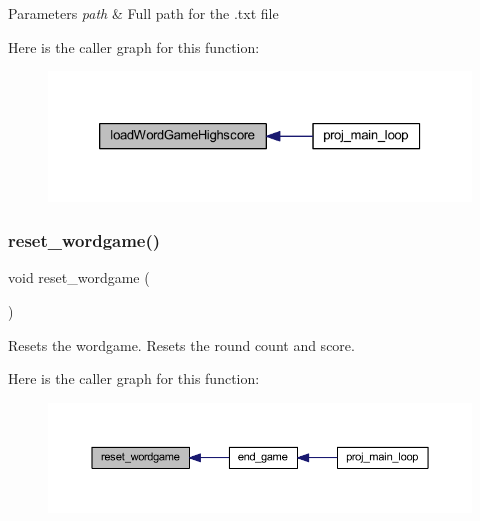 \begin{DoxyParams}{Parameters}
{\em path} & Full path for the .txt file \\
\hline
\end{DoxyParams}
Here is the caller graph for this function\+:\nopagebreak
\begin{figure}[H]
\begin{center}
\leavevmode
\includegraphics[width=326pt]{group__wordpicker_gab63191abcd00066c036c0b26e148651a_icgraph}
\end{center}
\end{figure}
\mbox{\label{group__wordpicker_ga974e197af1626e02aabe31f7eeb6ba85}} 
\subsubsection{\texorpdfstring{reset\+\_\+wordgame()}{reset\_wordgame()}}
{\footnotesize\ttfamily void reset\+\_\+wordgame (\begin{DoxyParamCaption}{ }\end{DoxyParamCaption})}



Resets the wordgame. Resets the round count and score. 

Here is the caller graph for this function\+:\nopagebreak
\begin{figure}[H]
\begin{center}
\leavevmode
\includegraphics[width=350pt]{group__wordpicker_ga974e197af1626e02aabe31f7eeb6ba85_icgraph}
\end{center}
\end{figure}
\mbox{\label{group__wordpicker_gaed4201a80c5cb2936c795fa51d9f0841}} 
